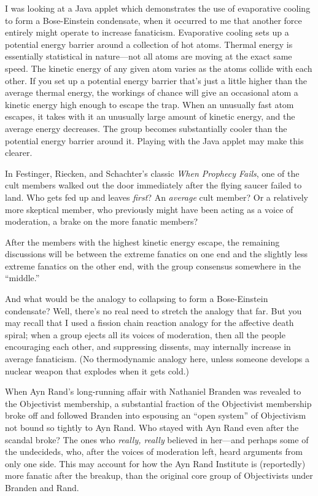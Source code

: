 {
 I was looking at a Java applet which demonstrates the use of
evaporative cooling to form a Bose-Einstein condensate, when it
occurred to me that another force entirely might operate to increase
fanaticism. Evaporative cooling sets up a potential energy barrier
around a collection of hot atoms. Thermal energy is essentially
statistical in nature---not all atoms are moving at the exact same
speed. The kinetic energy of any given atom varies as the atoms collide
with each other. If you set up a potential energy barrier
that's just a little higher than the average thermal
energy, the workings of chance will give an occasional atom a kinetic
energy high enough to escape the trap. When an unusually fast atom
escapes, it takes with it an unusually large amount of kinetic energy,
and the average energy decreases. The group becomes substantially
cooler than the potential energy barrier around it. Playing with the
Java applet may make this clearer.}

{
 In Festinger, Riecken, and Schachter's classic
\textit{When Prophecy Fails}, one of the cult members walked out the
door immediately after the flying saucer failed to
land. Who gets fed up and leaves \textit{first}? An
\textit{average} cult member? Or a relatively more skeptical member,
who previously might have been acting as a voice of moderation, a brake
on the more fanatic members?}

{
 After the members with the highest kinetic energy escape, the
remaining discussions will be between the extreme fanatics on one end
and the slightly less extreme fanatics on the other end, with the group
consensus somewhere in the
``middle.''}

{
 And what would be the analogy to collapsing to form a
Bose-Einstein condensate? Well, there's no real need to
stretch the analogy that far. But you may recall that I used a fission
chain reaction analogy for the affective death spiral; when a group
ejects all its voices of moderation, then all the people encouraging
each other, and suppressing dissents, may internally increase in
average fanaticism. (No thermodynamic analogy here, unless someone
develops a nuclear weapon that explodes when it gets cold.)}

{
 When Ayn Rand's long-running affair with Nathaniel
Branden was revealed to the Objectivist membership, a substantial
fraction of the Objectivist membership broke off and followed Branden
into espousing an ``open system'' of
Objectivism not bound so tightly to Ayn Rand. Who stayed with Ayn Rand
even after the scandal broke? The ones who \textit{really, really}
believed in her---and perhaps some of the undecideds, who, after the
voices of moderation left, heard arguments from only one side. This may
account for how the Ayn Rand Institute is (reportedly) more fanatic
after the breakup, than the original core group of Objectivists under
Branden and Rand.}

